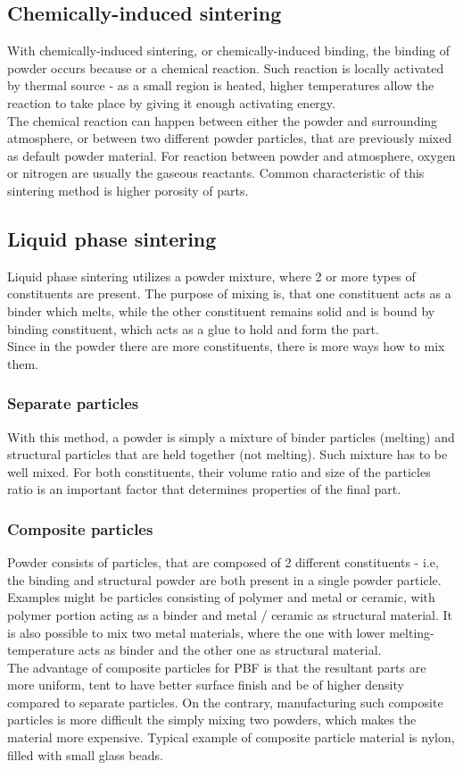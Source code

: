 \documentclass[a4paper, twoside, 11pt]{report}
\begin{document}
\subsection{Chemically-induced sintering}
With chemically-induced sintering, or chemically-induced binding, the binding of powder occurs because or a chemical reaction. Such reaction is locally activated by thermal source - as a small region is heated, higher temperatures allow the reaction to take place by giving it enough activating energy.\\
	The chemical reaction can happen between either the powder and surrounding atmosphere, or between two different powder particles, that are previously mixed as default powder material. For reaction between powder and atmosphere, oxygen or nitrogen are usually the gaseous reactants. Common characteristic of this sintering method is higher porosity of parts.
\subsection{Liquid phase sintering}
Liquid phase sintering utilizes a powder mixture, where 2 or more types of constituents are present. The purpose of mixing is, that one constituent acts as a binder which melts, while the other constituent remains solid and is bound by binding constituent, which acts as a glue to hold and form the part.\\
	Since in the powder there are more constituents, there is more ways how to mix them.
	
\subsubsection{Separate particles}
With this method, a powder is simply a mixture of binder particles (melting) and structural particles that are held together (not melting). Such mixture has to be well mixed. For both constituents, their volume ratio and size of the particles ratio is an important factor that determines properties of the final part.
\subsubsection{Composite particles}
Powder consists of particles, that are composed of 2 different constituents - i.e, the binding and structural powder are both present in a single powder particle. Examples might be particles consisting of polymer and metal or ceramic, with polymer portion acting as a binder and metal / ceramic as structural material. It is also possible to mix two metal materials, where the one with lower melting-temperature acts as binder and the other one as structural material.\\
	The advantage of composite particles for PBF is that the resultant parts are more uniform, tent to have better surface finish and be of higher density compared to separate particles. On the contrary, manufacturing such composite particles is more difficult the simply mixing two powders, which makes the material more expensive. Typical example of composite particle material is nylon, filled with small glass beads.
\end{document}
